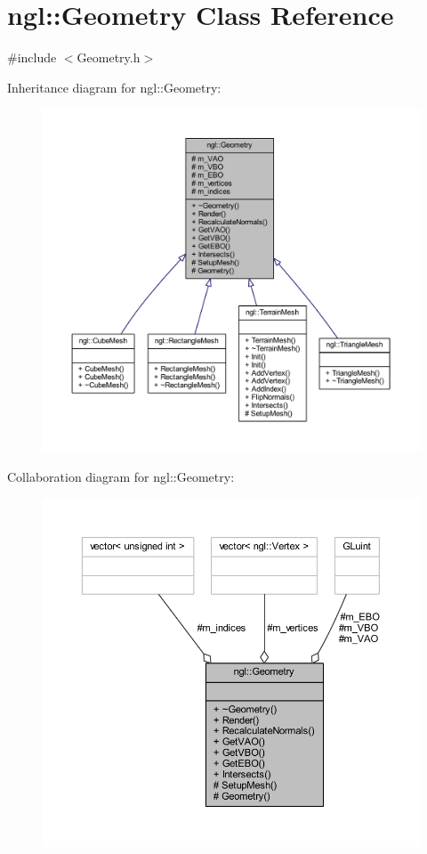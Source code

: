 \hypertarget{classngl_1_1_geometry}{}\section{ngl\+:\+:Geometry Class Reference}
\label{classngl_1_1_geometry}


{\ttfamily \#include $<$Geometry.\+h$>$}



Inheritance diagram for ngl\+:\+:Geometry\+:
\nopagebreak
\begin{figure}[H]
\begin{center}
\leavevmode
\includegraphics[width=350pt]{classngl_1_1_geometry__inherit__graph}
\end{center}
\end{figure}


Collaboration diagram for ngl\+:\+:Geometry\+:
\nopagebreak
\begin{figure}[H]
\begin{center}
\leavevmode
\includegraphics[width=350pt]{classngl_1_1_geometry__coll__graph}
\end{center}
\end{figure}
